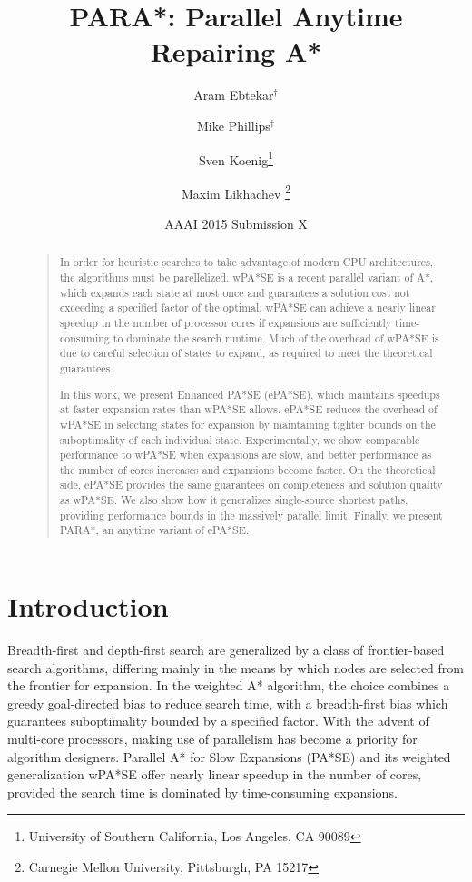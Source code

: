 \documentclass[letterpaper]{article}
\begin{document}
%
\title{PARA*: Parallel Anytime Repairing A*}
\author{Aram Ebtekar$^\dagger$ \and Mike Phillips$^\dagger$ \and Sven Koenig\thanks{University of Southern California, Los Angeles, CA 90089} \and Maxim Likhachev%
\thanks{Carnegie Mellon University, Pittsburgh, PA 15217}%
%
}
\author{AAAI 2015 Submission X}%
\maketitle
\begin{abstract}
\begin{quote}
In order for heuristic searches to take advantage of modern CPU architectures, the algorithms must be parellelized.
wPA*SE is a recent parallel variant of A*, which expands each state at most once and guarantees a solution cost not exceeding a specified factor of the optimal. wPA*SE can achieve a nearly linear speedup in the number of processor cores if expansions are sufficiently time-consuming to dominate the search runtime.
Much of the overhead of wPA*SE is due to careful selection of states to expand, as required to meet the theoretical guarantees.

In this work, we present Enhanced PA*SE (ePA*SE), which maintains speedups at faster expansion rates than wPA*SE allows. ePA*SE reduces the overhead of wPA*SE in selecting states for expansion by maintaining tighter bounds on the suboptimality of each individual state.
Experimentally, we show comparable performance to wPA*SE when expansions are slow, and better performance as the number of cores increases and expansions become faster. On the theoretical side, ePA*SE provides the same guarantees on completeness and solution quality as wPA*SE. We also show how it generalizes single-source shortest paths, providing performance bounds in the massively parallel limit. Finally, we present PARA*, an anytime variant of ePA*SE.
\end{quote}
\end{abstract}

\section{Introduction}

Breadth-first and depth-first search are generalized by a class of frontier-based search algorithms, differing mainly in the means by which nodes are selected from the frontier for expansion. In the weighted A* algorithm, the choice combines a greedy goal-directed bias to reduce search time, with a breadth-first bias which guarantees suboptimality bounded by a specified factor. With the advent of multi-core processors, making use of parallelism has become a priority for algorithm designers. Parallel A* for Slow Expansions (PA*SE) and its weighted generalization wPA*SE offer nearly linear speedup in the number of cores, provided the search time is dominated by time-consuming expansions.
\end{document}
